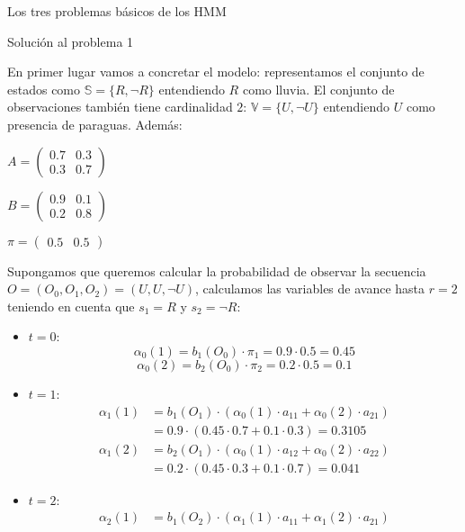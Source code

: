 \begin{section}{Los tres problemas básicos de los HMM}
\begin{subsection}{Solución al problema 1}
\begin{exampleth}\label{ejemplo_paraguasSol1}
En primer lugar vamos a concretar el modelo: representamos el conjunto de estados como $\mathbb{S}=\{R,\neg R\}$ entendiendo $R$ como lluvia. El conjunto de observaciones también tiene cardinalidad $2$: $\mathbb{V}=\{U,\neg U\}$ entendiendo $U$ como presencia de paraguas. Además:
\begin{center}
    $A=\begin{pmatrix}
    0.7 & 0.3\\
    0.3 & 0.7
    \end{pmatrix}$
\end{center}
\begin{center}
    $B=\begin{pmatrix}
    0.9 & 0.1 \\
    0.2 & 0.8
    \end{pmatrix}$
\end{center}
\begin{center}
    $\pi=\begin{pmatrix}
    0.5 & 0.5
    \end{pmatrix}$
\end{center}
Supongamos que queremos calcular la probabilidad de observar la secuencia $O=(O_0,O_1,O_2)=(U,U,\neg U)$, calculamos las variables de avance hasta $r=2$ teniendo en cuenta que $s_1=R$ y $s_2=\neg R$:
\begin{itemize}
    \item $t=0$:
    \[\alpha_0(1)=b_1(O_0)\cdot\pi_1=0.9\cdot0.5=0.45\]
    \[\alpha_0(2)=b_2(O_0)\cdot\pi_2=0.2\cdot0.5=0.1\]
    \item $t=1$:
    \[
    \begin{aligned}
        \alpha_1(1)&=b_1(O_1)\cdot\left(\alpha_0(1)\cdot a_{11}+\alpha_0(2)\cdot a_{21} \right)\\
        &=0.9\cdot\left( 0.45\cdot0.7+0.1\cdot0.3 \right) = 0.3105
    \end{aligned}
    \]
    \[
    \begin{aligned}
        \alpha_1(2)&=b_2(O_1)\cdot\left(\alpha_0(1)\cdot a_{12}+\alpha_0(2)\cdot a_{22} \right)\\
        &=0.2\cdot\left(0.45\cdot0.3+0.1\cdot0.7\right)=0.041
    \end{aligned}
    \]
    \item $t=2$:
    \[
    \begin{aligned}
        \alpha_2(1)&=b_1(O_2)\cdot\left(\alpha_1(1)\cdot a_{11}+\alpha_1(2)\cdot a_{21} \right)\\

\end{aligned}\]
\end{itemize}
\end{exampleth}
\end{subsection}
\end{section}
